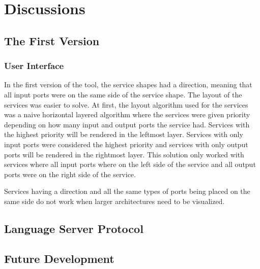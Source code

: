 \chapter{Discussions}

\section{The First Version}

\subsection{User Interface}
In the first version of the tool, the service shapes had a direction, meaning that all input ports were on the same side of the service shape. The layout of the services was easier to solve.
At first, the layout algorithm used for the services was a naive horizontal layered algorithm where the services were given priority depending on how many input and output ports the service had.
Services with the highest priority will be rendered in the leftmost layer. Services with only input ports were considered the highest priority and services with only output ports will be rendered in the rightmost layer.
This solution only worked with services where all input ports where on the left side of the service and all output ports were on the right side of the service.

Services having a direction and all the same types of ports being placed on the same side do not work when larger architectures need to be visualized.

\section{Language Server Protocol}

\section{Future Development}